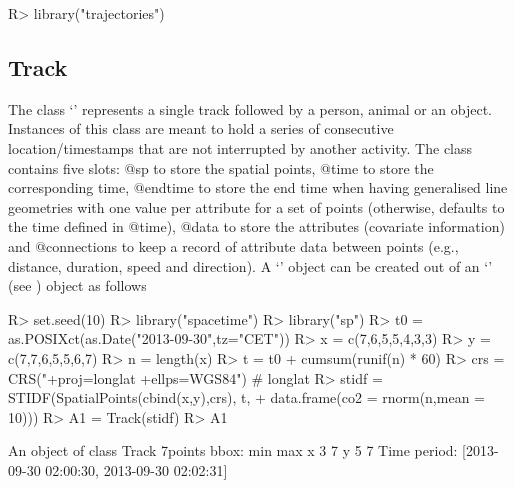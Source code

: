 \documentclass[article]{jss}
\newcommand{\class}[1]{`\code{#1}'}
\begin{document}
\begin{Sinput}
R> library("trajectories")
\end{Sinput}

\subsection{Track}
The class \class{Track} represents a single track followed by a person, animal or an object. Instances of this class are meant to hold a series of consecutive location/timestamps that are not interrupted by another activity. The class contains five slots: @sp to store the spatial points, @time to store the corresponding time, @endtime to store the end time when having generalised line geometries with one value per attribute for a set of points (otherwise, defaults to the time defined in @time), @data to store the attributes (covariate information) and @connections to keep a record of attribute data between points (e.g., distance, duration, speed and direction). A \class{Track} object can be created out of an \class{STIDF} (see \cite{spacetime}) object as follows
\begin{Sinput}
R> set.seed(10)
R> library("spacetime")
R> library("sp")
R> t0 = as.POSIXct(as.Date("2013-09-30",tz="CET"))
R> x = c(7,6,5,5,4,3,3)
R> y = c(7,7,6,5,5,6,7)
R> n = length(x)
R> t = t0 + cumsum(runif(n) * 60)
R> crs = CRS("+proj=longlat +ellps=WGS84") # longlat
R> stidf = STIDF(SpatialPoints(cbind(x,y),crs), t, 
+                  data.frame(co2 = rnorm(n,mean = 10)))
R> A1 = Track(stidf)
R> A1
\end{Sinput}
\begin{Soutput}
An object of class Track 
7points 
bbox: 
  min max
x   3   7
y   5   7
Time period: [2013-09-30 02:00:30, 2013-09-30 02:02:31]
\end{Soutput}
\end{document}

